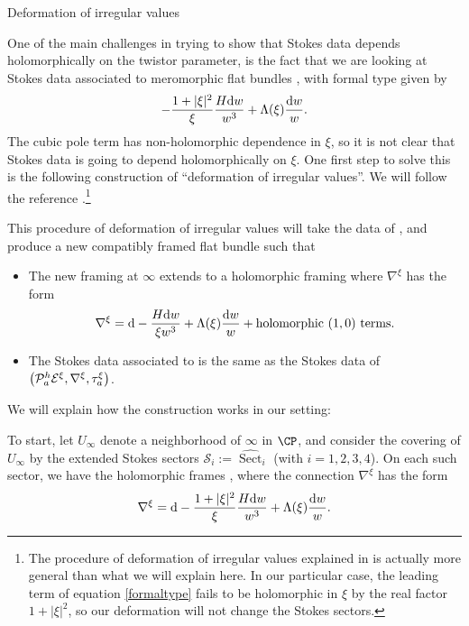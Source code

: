 \begin{subsubsection}{Deformation of irregular values}\label{defirr}

One of the main challenges in trying to show that Stokes data depends holomorphically on the twistor parameter, is the fact that we are looking at Stokes data associated to meromorphic flat bundles , with formal type given by
\begin{equation}\label{formaltype}
 -\frac{1+|\xi|^2}{\xi}\frac{H{\rm d}w}{ w^3}+\Lambda(\xi)\frac{{\rm d}w}{w}.
\end{equation}
The cubic pole term has non-holomorphic dependence in $\xi$, so it is not clear that Stokes data is going to depend holomorphically on $\xi$. One first step to solve this is the following construction of ``deformation of irregular values''. We will follow the reference \cite[Section 4.5]{M}.\footnote{The procedure of deformation of irregular values explained in \cite{M} is actually more general than what we will explain here. In our particular case, the leading term of equation \eqref{formaltype} fails to be holomorphic in $\xi$ by the real factor $1+|\xi|^2$, so our deformation will not change the Stokes sectors.}

This procedure of deformation of irregular values will take the data of , and produce a new compatibly framed flat bundle  such that
\begin{itemize}\itemsep=0pt
 \item The new framing at $\infty$ extends to a holomorphic framing where $\nabla^{\xi}$ has the form
 \begin{equation*}
 \nabla^{\xi}={\rm d}-\frac{H{\rm d}w}{ \xi w^3}+\Lambda(\xi)\frac{{\rm d}w}{w}+\text{holomorphic $(1,0)$ terms}.
 \end{equation*}
 \item The Stokes data associated to  is the same as the Stokes data of $\smash{\bigl(\mathcal{P}^h_a\mathcal{E}^{\xi},\nabla^{\xi}},\allowbreak\smash{\tau^{\xi}_{a}}\bigr)$.
\end{itemize}
We will explain how the construction works in our setting:

To start, let $U_{\infty}$ denote a neighborhood of $\infty$ in $\CP$, and consider the covering of $U_{\infty}$ by the extended Stokes sectors $\mathcal{S}_i:=\widehat{\operatorname{Sect}}_i$ (with $i=1,2,3,4$). On each such sector, we have the holomorphic frames , where the connection $\nabla^{\xi}$ has the form
\begin{equation}\label{canonical form}
 \nabla^{\xi}={\rm d}-\frac{1+|\xi|^2}{\xi}\frac{H{\rm d}w}{ w^3}+\Lambda(\xi)\frac{{\rm d}w}{w}.
\end{equation}


\end{subsubsection}
